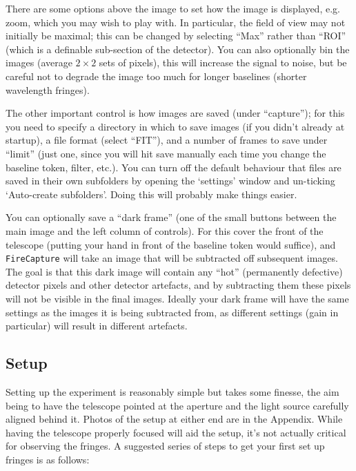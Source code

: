 \documentclass[11pt]{article}
\begin{document}
There are some options above the image to set how the image is displayed, e.g. zoom, which you may wish to play with. In particular, the field of view may not initially be maximal; this can be changed by selecting ``Max'' rather than ``ROI'' (which is a definable sub-section of the detector). You can also optionally bin the images (average $2 \times 2$ sets of pixels), this will increase the signal to noise, but be careful not to degrade the image too much for longer baselines (shorter wavelength fringes).

The other important control is how images are saved (under ``capture''); for this you need to specify a directory in which to save images (if you didn't already at startup), a file format (select ``FIT''), and a number of frames to save under ``limit'' (just one, since you will hit save manually each time you change the baseline token, filter, etc.). You can turn off the default behaviour that files are saved in their own subfolders by opening the `settings' window and un-ticking `Auto-create subfolders'. Doing this will probably make things easier.

You can optionally save a ``dark frame'' (one of the small buttons between the main image and the left column of controls). For this cover the front of the telescope (putting your hand in front of the baseline token would suffice), and \texttt{FireCapture} will take an image that will be subtracted off subsequent images. The goal is that this dark image will contain any ``hot'' (permanently defective) detector pixels and other detector artefacts, and by subtracting them these pixels will not be visible in the final images. Ideally your dark frame will have the same settings as the images it is being subtracted from, as different settings (gain in particular) will result in different artefacts.

\subsection{Setup}\label{sec:setup}

Setting up the experiment is reasonably simple but takes some finesse, the aim being to have the telescope pointed at the aperture and the light source carefully aligned behind it. Photos of the setup at either end are in the Appendix. While having the telescope properly focused will aid the setup, it's not actually critical for observing the fringes. A suggested series of steps to get your first set up fringes is as follows:
\end{document}

